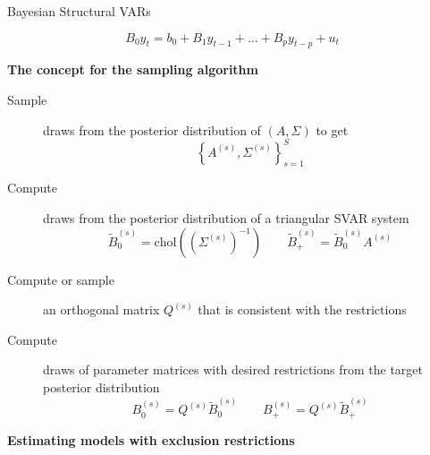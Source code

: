 \documentclass[notes,blackandwhite,mathsans,usenames,dvipsnames]{beamer}
\begin{document}
\begin{frame}{Bayesian Structural VARs}

$$ B_0y_t = b_0 + B_1y_{t-1}+ \dots + B_py_{t-p} + u_t $$

\bigskip\textbf{The concept for the sampling algorithm}
\begin{description}
\item[Sample] {\color{mcxs2}draws from the posterior distribution of} $(A,\Sigma)$ {\color{mcxs2}to get}
$$ \left\{A^{(s)},\Sigma^{(s)}\right\}_{s=1}^S $$
\item[Compute] {\color{mcxs2}draws from the posterior distribution of a triangular SVAR system}
$$ \tilde{B}_0^{(s)} = \text{chol}\left(\left(\Sigma^{(s)}\right)^{-1}\right) \qquad
\tilde{B}_+^{(s)} = \tilde{B}_0^{(s)}A^{(s)} $$
\item[Compute or sample] {\color{mcxs2}an orthogonal matrix} $Q^{(s)}$ {\color{mcxs2}that is consistent with the restrictions}
\item[Compute] {\color{mcxs2}draws of parameter matrices with desired restrictions from the target posterior distribution}
$$ B_0^{(s)} = Q^{(s)}\tilde{B}_0^{(s)}  \qquad
B_+^{(s)} = Q^{(s)}\tilde{B}_+^{(s)}  $$
\end{description}

\end{frame}





%
%
%
%
%
%
%






{
\begin{frame}

\begin{adjustwidth}{-0.5cm}{0cm}
\vspace{8.3cm}\Large
\textbf{{\color{mcxs2}Estimating models with} {\color{mcxs1}exclusion restrictions}}
\end{adjustwidth}

\end{frame}
}
\end{document}
